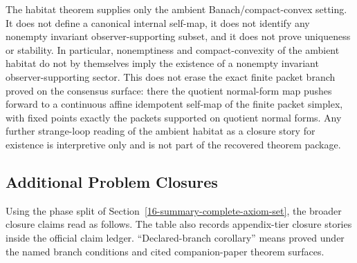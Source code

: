 The habitat theorem supplies only the ambient Banach/compact-convex setting. It does not define a
canonical internal self-map, it does not identify any nonempty invariant observer-supporting subset,
and it does not prove uniqueness or stability. In particular, nonemptiness and compact-convexity
of the ambient habitat do not by themselves imply the existence of a nonempty invariant
observer-supporting sector. This does not erase the exact finite packet branch proved on the
consensus surface: there the quotient normal-form map pushes forward to a continuous
affine idempotent self-map of the finite packet simplex, with fixed points exactly the packets
supported on quotient normal forms. Any further strange-loop reading of the ambient habitat as a
closure story for existence is interpretive only and is not part of the recovered theorem package.

\subsection{Additional Problem Closures}

Using the phase split of Section~\ref{16-summary-complete-axiom-set}, the broader closure claims
read as follows. The table also records appendix-tier closure stories inside the official claim
ledger. ``Declared-branch corollary'' means proved under the named branch conditions and cited
companion-paper theorem surfaces.

